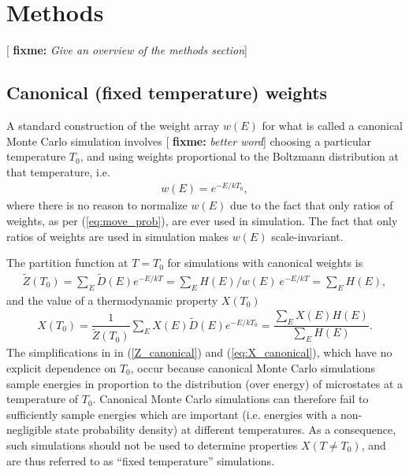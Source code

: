 \documentclass[11pt]{article}
\newcommand{\f}[2]{\dfrac{#1}{#2}} %
\newcommand{\p}[1]{\left(#1\right)} %
\newcommand{\red}[1]{{\bf \color{red} #1}}
\newcommand{\fixme}[1]{[\red{fixme:} \emph{#1}]}
\begin{document}
\section{Methods}
\label{sec:methods}

\fixme{Give an overview of the methods section}

\subsection{Canonical (fixed temperature) weights}
\label{sec:canonical_weights}

A standard construction of the weight array $w\p{E}$ for what is
called a canonical Monte Carlo simulation involves \fixme{better word}
choosing a particular temperature $T_0$, and using weights
proportional to the Boltzmann distribution at that temperature, i.e.
\begin{align}
  w\p{E}=e^{-E/kT_0},
\end{align}
where there is no reason to normalize $w\p{E}$ due to the fact that
only ratios of weights, as per (\ref{eq:move_prob}), are ever used in
simulation. The fact that only ratios of weights are used in
simulation makes $w\p{E}$ scale-invariant.

The partition function at $T=T_0$ for simulations with canonical
weights is
\begin{align}
  \tilde Z\p{T_0}=\sum_E\tilde D\p{E}e^{-E/kT}
  =\sum_EH\p{E}/w\p{E}~e^{-E/kT} =\sum_EH\p{E},
  \label{Z_canonical}
\end{align}
and the value of a thermodynamic property $X\p{T_0}$
\begin{align}
  X\p{T_0}=\f1{\tilde Z\p{T_0}}\sum_EX\p{E}\tilde D\p{E}e^{-E/kT_0}
  =\f{\sum_EX\p{E}H\p{E}}{\sum_EH\p{E}}.
  \label{eq:X_canonical}
\end{align}
The simplifications in in (\ref{Z_canonical}) and
(\ref{eq:X_canonical}), which have no explicit dependence on $T_0$,
occur because canonical Monte Carlo simulations sample energies in
proportion to the distribution (over energy) of microstates at a
temperature of $T_0$.  Canonical Monte Carlo simulations can therefore
fail to sufficiently sample energies which are important
(i.e. energies with a non-negligible state probability density) at
different temperatures. As a consequence, such simulations should not
be used to determine properties $X\p{T\ne T_0}$, and are thus referred
to as ``fixed temperature'' simulations.
\end{document}
